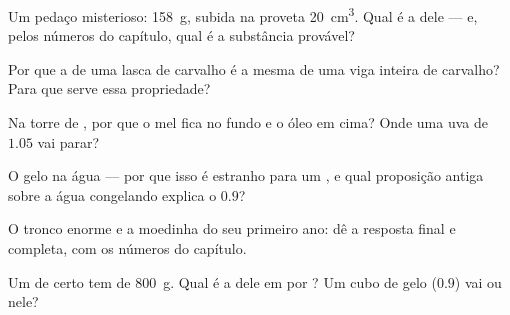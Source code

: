 \begin{exercise}[$\star$]\label{exo:g6:density-floating:4}
Um pedaço misterioso:  \qty{158}{g}, subida na proveta
\qty{20}{cm^3}. Qual é a  dele --- e, pelos números do
capítulo, qual é a substância provável?
\end{exercise}

\begin{exercise}[$\star$]\label{exo:g6:density-floating:5}
Por que a  de uma lasca de carvalho é a mesma de uma viga
inteira de carvalho? Para que serve essa propriedade?
\end{exercise}

\begin{exercise}[$\star$]\label{exo:g6:density-floating:6}
Na torre de , por que o mel fica no fundo e o óleo em cima?
Onde uma uva de  $1.05$ vai parar?
\end{exercise}

\begin{exercise}[$\star$]\label{exo:g6:density-floating:7}
O gelo  na água --- por que isso é estranho para um , e
qual proposição antiga sobre a água congelando explica o $0.9$?
\end{exercise}

\begin{exercise}[$\star$]\label{exo:g6:density-floating:8}
O tronco enorme e a moedinha do seu primeiro ano: dê a resposta
final e completa, com os números do capítulo.
\end{exercise}

\begin{exercise}[$\star\star$]\label{exo:g6:density-floating:9}
Um  de certo  tem  de \qty{800}{g}. Qual é a
 dele em  por ? Um cubo de gelo
($0.9$) vai  ou  nele?
\end{exercise}

